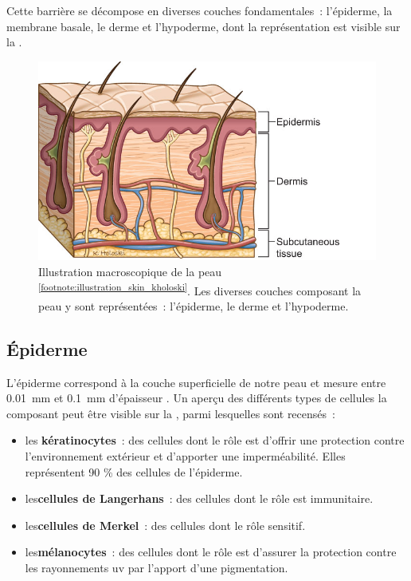 Cette barrière se décompose en diverses couches fondamentales~: l’épiderme, la membrane basale, le derme et l’hypoderme, dont la représentation est visible sur la .\par
\begin{figure}[H]
    \centering
    \includegraphics[width=0.6\linewidth]{contents/chapter_1/resources/illustration_skin_kholoski.png}
    \caption{Illustration macroscopique de la peau \textsuperscript{\ref{footnote:illustration_skin_kholoski}}. Les diverses couches composant la peau y sont représentées~: l'épiderme, le derme et l'hypoderme.}
    \label{fig:illustration_skin_kholoski}
\end{figure}
\addtocounter{footnote}{1}
\clearpage

\subsection{Épiderme}
L’épiderme correspond à la couche superficielle de notre peau et mesure entre \SI{0,01}{\milli\metre} et \SI{0,1}{\milli\metre} d’épaisseur \cite{Sandby-Moller2003}. Un aperçu des différents types de cellules la composant peut être visible sur la , parmi lesquelles sont recensés~:
\begin{itemize}
    \item les \textbf{kératinocytes}~: des cellules dont le rôle est d'offrir une protection contre l'environnement extérieur et d'apporter une imperméabilité. Elles représentent 90 \% des cellules de l'épiderme.
    \item les\textbf{cellules de Langerhans}~: des cellules dont le rôle est immunitaire.
    \item les\textbf{cellules de Merkel}~: des cellules dont le rôle sensitif.
    \item les\textbf{mélanocytes}~: des cellules dont le rôle est d'assurer la protection contre les rayonnements \gls{uv} par l'apport d'une pigmentation.
\end{itemize}\par

